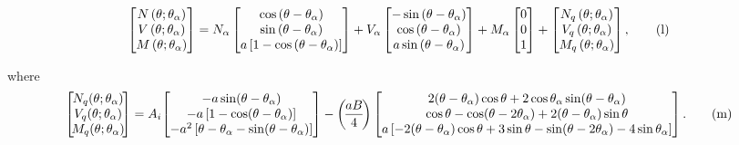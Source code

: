 \documentclass{AeroStructure-ERJohnson}
\begin{document}
\begin{example}
\begin{equation}
\left[\begin{array}{@{}c@{}}N\left(\theta ; \theta_{\alpha}\right) \\V\left(\theta ; \theta_{\alpha}\right) \\M\left(\theta ; \theta_{\alpha}\right)\end{array}\right]=N_{\alpha}\left[\begin{array}{@{}c@{}}\cos \left(\theta-\theta_{\alpha}\right) \\\sin \left(\theta-\theta_{\alpha}\right) \\a\left[1-\cos \left(\theta-\theta_{\alpha}\right)\right]\end{array}\right]+V_{\alpha}\left[\begin{array}{@{}c@{}}-\sin \left(\theta-\theta_{\alpha}\right) \\\cos \left(\theta-\theta_{\alpha}\right) \\a \sin \left(\theta-\theta_{\alpha}\right)\end{array}\right]+M_{\alpha}\left[\begin{array}{@{}l@{}}0 \\0 \\1\end{array}\right]+\left[\begin{array}{@{}c@{}}N_{q}\left(\theta ; \theta_{\alpha}\right) \\V_{q}\left(\theta ; \theta_{\alpha}\right) \\M_{q}\left(\theta ; \theta_{\alpha}\right)\end{array}\right], \label{eq7.7.l}\tag{l}
\end{equation}

\clearpage

\noindent where
\begin{equation}
\left[\!\begin{array}{@{}c@{}}N_{q}(\theta ; \theta_{\alpha}) \\V_{q}(\theta ; \theta_{\alpha}) \\M_{q}(\theta ; \theta_{\alpha})\end{array}\!\right]=A_{i}\!\left[\begin{array}{@{}c@{}}-a \sin (\theta-\theta_{\alpha}) \\-a\left[1-\cos (\theta-\theta_{\alpha})\right] \\-a^{2}\left[\theta-\theta_{\alpha}-\sin (\theta-\theta_{\alpha})\right]\end{array}\right]-\left(\!\frac{a B}{4}\!\right)\left[\begin{array}{@{}c@{}}2(\theta-\theta_{\alpha}) \cos \theta+2 \cos \theta_{\alpha} \sin (\theta-\theta_{\alpha}) \\\cos \theta-\cos (\theta-2 \theta_{\alpha})+2(\theta-\theta_{\alpha}) \sin \theta \\a\left[-2(\theta-\theta_{\alpha}) \cos \theta+3 \sin \theta-\sin (\theta-2 \theta_{\alpha})-4 \sin \theta_{\alpha}\right]\end{array}\right]. \label{eq7.7.m}\tag{m}
\end{equation}


\end{example}
\end{document}
